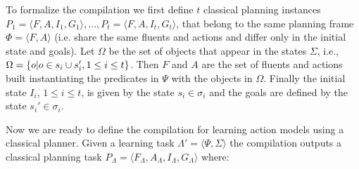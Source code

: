 \documentclass[letterpaper]{article} %
\newcommand{\tup}[1]{{\langle #1 \rangle}}
\begin{document}
To formalize the compilation we first define $t$ classical planning instances $P_1=\tup{F,A,I_1,G_1},\ldots,P_t=\tup{F,A,I_t,G_t}$, that belong to the same planning frame $\Phi=\tup{F,A}$ (i.e. share the same fluents and actions and differ only in the initial state and goals). Let $\Omega$ be the set of objects that appear in the states $\Sigma$, i.e., $\Omega=\{o|o\in s_i\cup s_i', {\small 1\leq i\leq t}\}$. Then $F$ and $A$ are the set of fluents and actions built instantiating the predicates in $\Psi$ with the objects in $\Omega$.  Finally the initial state $I_i$, {\small $1\leq i\leq t$}, is given by the state $s_i\in \sigma_i$ and the goals are defined by the state $s_i'\in \sigma_i$. 

Now we are ready to define the compilation for learning action models using a classical planner. Given a learning task $\Lambda'=\tup{\Psi,\Sigma}$ the compilation outputs a classical planning task $P_{\Lambda}=\tup{F_{\Lambda},A_{\Lambda},I_{\Lambda},G_{\Lambda}}$ where:
\end{document}
